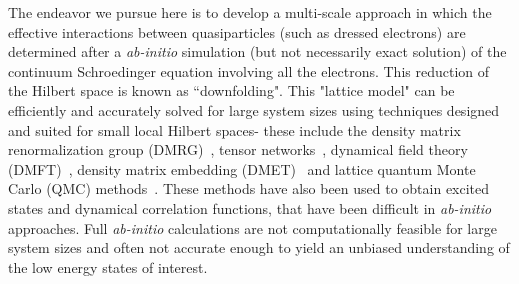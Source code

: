 \documentclass[prl,12pt,onecolumn,nofootinbib,notitlepage,english,superscriptaddress]{revtex4-1}
\newcommand{\HJC}[1]{{\color{RED}{\bf HJC: #1}}}
\begin{document}

The endeavor we pursue here is to develop a multi-scale approach in which the effective interactions between 
quasiparticles (such as dressed electrons) are determined after a \emph{ab-initio} simulation (but not necessarily exact 
solution) of the continuum Schroedinger equation involving all the electrons. This reduction 
of the Hilbert space is known as ``downfolding". This "lattice model" can be efficiently and accurately 
solved for large system sizes using techniques designed and suited for small local Hilbert spaces- these include 
the density matrix renormalization group (DMRG)~\cite{White1992}, tensor networks~\cite{PEPS,Changlani_CPS,NeuscammanCPS}, 
dynamical field theory (DMFT)~\cite{}, density matrix embedding (DMET)~\cite{DMET_2012} 
and lattice quantum Monte Carlo (QMC) methods~\cite{Booth2009,SQMC,Sandvik_loops,Booth2013}. 
These methods have also been used to obtain excited states and dynamical correlation functions, that 
have been difficult in \emph{ab-initio} approaches. 
Full \emph{ab-initio} calculations are not computationally feasible for large system sizes 
and often not accurate enough to yield an unbiased understanding of the low energy states of interest. 
\end{document}
